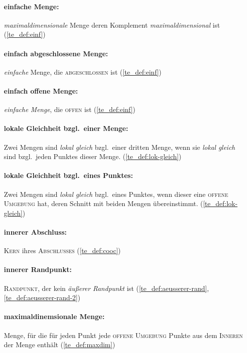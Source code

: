    \paragraph{einfache Menge:} \textit{maximaldimensionale} Menge deren Komplement \textit{maximaldimensional} ist (\ref{te_def:einf})
    
    \paragraph{einfach abgeschlossene Menge:} \textit{einfache} Menge, die \textsc{abgeschlossen} ist (\ref{te_def:einf})
    
    \paragraph{einfach offene Menge:} \textit{einfache Menge}, die \textsc{offen} ist (\ref{te_def:einf})
    
    \paragraph{lokale Gleichheit bzgl.\ einer Menge:} Zwei Mengen sind \textit{lokal gleich} bzgl.\ einer dritten Menge, wenn sie \textit{lokal gleich} sind bzgl.\ jeden Punktes dieser Menge. (\ref{te_def:lok-gleich})

    \paragraph{lokale Gleichheit bzgl.\ eines Punktes:} Zwei Mengen sind \textit{lokal gleich} bzgl.\ eines Punktes, wenn dieser eine \textsc{offene Umgebung} hat, deren Schnitt mit beiden Mengen übereinstimmt. (\ref{te_def:lok-gleich})
    
    \paragraph{innerer Abschluss:} \textsc{Kern} ihres \textsc{Abschlusses} (\ref{te_def:cooc})
    
    \paragraph{innerer Randpunkt:} \textsc{Randpunkt}, der kein \textit{äußerer Randpunkt} ist (\ref{te_def:aeusserer-rand}, \ref{te_def:aeusserer-rand-2})
    
    \paragraph{maximaldinemsionale Menge:} Menge, für die für jeden Punkt jede \textsc{offene Umgebung} Punkte aus dem \textsc{Inneren} der Menge enthält  (\ref{te_def:maxdim})
    
